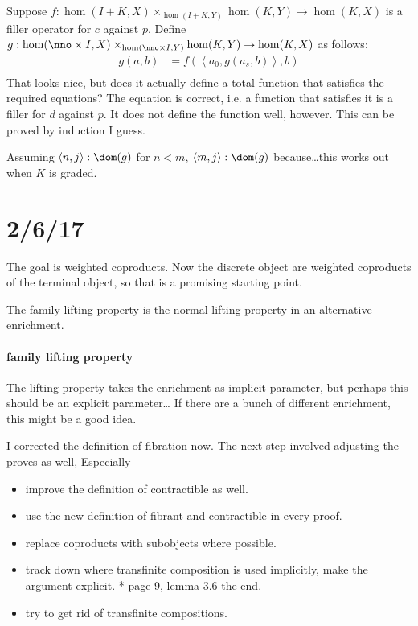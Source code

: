 \documentclass{tac}
\newcommand\of{:}
\newcommand\tuplet[1]{\left\langle #1 \right\rangle}
\begin{document}
Suppose $f\of \hom(I+K,X)\times_{\hom(I+K,Y)}\hom(K,Y) \to \hom(K,X)$ is a filler operator for $c$ against $p$.
Define $g\of\hom(\nno\times I,X)\times_{\hom(\nno \times I,Y)}\hom(K,Y) \to \hom(K,X)$ as follows:
\begin{align*}
g(a,b) &= f(\tuplet{a_0,g(a_s,b)},b)\\
\end{align*}
That looks nice, but does it actually define a total function that satisfies the required equations?
The equation is correct, i.e. a function that satisfies it is a filler for $d$ against $p$. It does not define the function well, however.
This can be proved by induction I guess.

Assuming $\tuplet{n,j}\of\dom(g)$ for $n < m$, $\tuplet{m,j}\of\dom(g)$ because\dots this works out when $K$ is graded.

\section{2/6/17}
The goal is weighted coproducts. Now the discrete object are weighted coproducts of the terminal object, so that is a promising starting point.


The family lifting property is the normal lifting property in an alternative enrichment.

\paragraph{family lifting property}
The lifting property takes the enrichment as implicit parameter, but perhaps this should be an explicit parameter\dots
If there are a bunch of different enrichment, this might be a good idea.


I corrected the definition of fibration now. The next step involved adjusting the proves as well,
Especially 

\begin{itemize}
\item improve the definition of contractible as well.
\item use the new definition of fibrant and contractible in every proof.
\item replace coproducts with subobjects where possible.
\item track down where transfinite composition is used implicitly, make the argument explicit.
  * page 9, lemma 3.6 the end.	
\item try to get rid of transfinite compositions.
\end{itemize}
\end{document}
